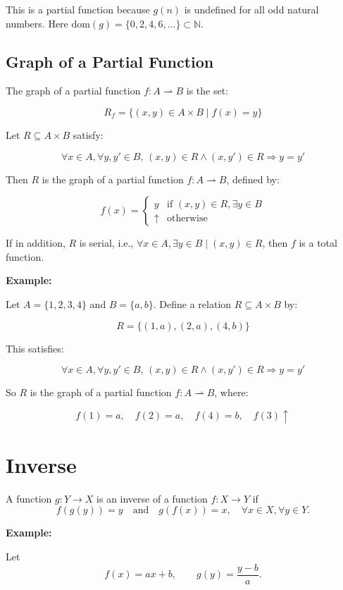 \documentclass[12pt,a4paper,openany]{article}
\begin{document}
This is a partial function because $g(n)$ is undefined for all odd natural numbers. Here $\text{dom}(g) = \{0, 2, 4, 6, ...\} \subset \mathbb{N}$.

\subsection{Graph of a Partial Function}

The graph of a partial function $f : A \rightharpoonup B$ is the set:

\[R_f = \{(x, y) \in A \times B \mid f(x) = y\}\]


Let $R \subseteq A \times B$ satisfy:

\[\forall x \in A, \forall y, y' \in B, \, (x, y) \in R \land (x, y') \in R \Rightarrow y = y'\]

Then $R$ is the graph of a partial function $f : A \rightharpoonup B$, defined by:

\[f(x) = \begin{cases} y & \text{if } (x, y) \in R, \exists y \in B \\ \uparrow & \text{otherwise} \end{cases}\]

If in addition, $R$ is serial, i.e., $\forall x \in A, \exists y \in B \mid (x, y) \in R$, then $f$ is a total function.

\textbf{Example:}

Let $A = \{1, 2, 3, 4\}$ and $B = \{a, b\}$. Define a relation $R \subseteq A \times B$ by:

\[R = \{(1, a), (2, a), (4, b)\}\]

This satisfies:

\[\forall x \in A, \forall y, y' \in B, \, (x, y) \in R \land (x, y') \in R \Rightarrow y = y'\]

So $R$ is the graph of a partial function $f : A \rightharpoonup B$, where:

\[f(1) = a,\quad f(2) = a,\quad f(4) = b,\quad f(3) \uparrow\]

\section{Inverse}

A function $g : Y \to X$ is an inverse of a function $f : X \to Y$ if
\[
f(g(y)) = y \quad \text{and} \quad g(f(x)) = x, \quad \forall x \in X, \forall y \in Y.
\]

\textbf{Example:}

Let
\[
f(x) = a x + b, \qquad g(y) = \frac{y - b}{a}.
\]
\end{document}
